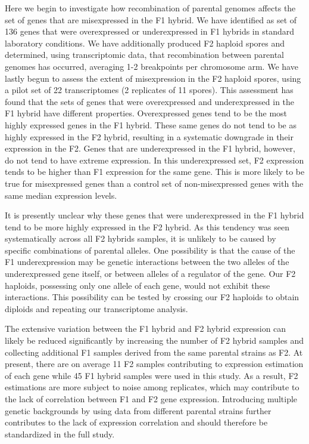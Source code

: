 Here we begin to investigate how recombination of parental genomes affects the set of genes that are misexpressed in the F1 hybrid. We have identified as set of 136 genes that were overexpressed or underexpressed in F1 hybrids in standard laboratory conditions. We have additionally produced F2 haploid spores and determined, using transcriptomic data, that recombination between parental genomes has occurred, averaging 1-2 breakpoints per chromosome arm. We have lastly begun to assess the extent of misexpression in the F2 haploid spores, using a pilot set of 22 transcriptomes (2 replicates of 11 spores). This assessment has found that the sets of genes that were overexpressed and underexpressed in the F1 hybrid have different properties. Overexpressed genes tend to be the most highly expressed genes in the F1 hybrid. These same genes do not tend to be as highly expressed in the F2 hybrid, resulting in a systematic downgrade in their expression in the F2. Genes that are underexpressed in the F1 hybrid, however, do not tend to have extreme expression. In this underexpressed set, F2 expression tends to be higher than F1 expression for the same gene. This is more likely to be true for misexpressed genes than a control set of non-misexpressed genes with the same median expression levels. 

It is presently unclear why these genes that were underexpressed in the F1 hybrid tend to be more highly expressed in the F2 hybrid. As this tendency was seen systematically across all F2 hybrids samples, it is unlikely to be caused by specific combinations of parental alleles. One possibility is that the cause of the F1 underexpression may be genetic interactions between the two alleles of the underexpressed gene itself, or between alleles of a regulator of the gene. Our F2 haploids, possessing only one allele of each gene, would not exhibit these interactions. This possibility can be tested by crossing our F2 haploids to obtain diploids and repeating our transcriptome analysis.

The extensive variation between the F1 hybrid and F2 hybrid expression can likely be reduced significantly by increasing the number of F2 hybrid samples and collecting additional F1 samples derived from the same parental strains as F2. At present, there are on average 11 F2 samples contributing to expression estimation of each gene while 45 F1 hybrid samples were used in this study. As a result, F2 estimations are more subject to noise among replicates, which may contribute to the lack of correlation between F1 and F2 gene expression. Introducing multiple genetic backgrounds by using data from different parental strains further contributes to the lack of expression correlation and should therefore be standardized in the full study.

